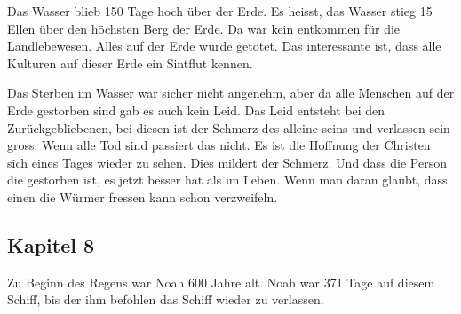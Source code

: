 Das Wasser blieb 150 Tage hoch über der Erde. Es heisst, das Wasser stieg 15 Ellen über den höchsten Berg der Erde. Da war kein entkommen für die Landlebewesen. Alles auf der Erde wurde getötet. Das interessante ist, dass alle Kulturen auf dieser Erde ein Sintflut kennen.

Das Sterben im Wasser war sicher nicht angenehm, aber da alle Menschen auf der Erde gestorben sind gab es auch kein Leid. Das Leid entsteht bei den Zurückgebliebenen, bei diesen ist der Schmerz des alleine seins und verlassen sein gross. Wenn alle Tod sind passiert das nicht. Es ist die Hoffnung der Christen sich eines Tages wieder zu sehen. Dies mildert der Schmerz. Und dass die Person die gestorben ist, es jetzt besser hat als im Leben. Wenn man daran glaubt, dass einen die Würmer fressen kann schon verzweifeln.
\subsection{Kapitel 8}
Zu Beginn des Regens war Noah 600 Jahre alt. Noah war 371 Tage auf diesem Schiff, bis der \herr{} ihm befohlen das Schiff wieder zu verlassen.